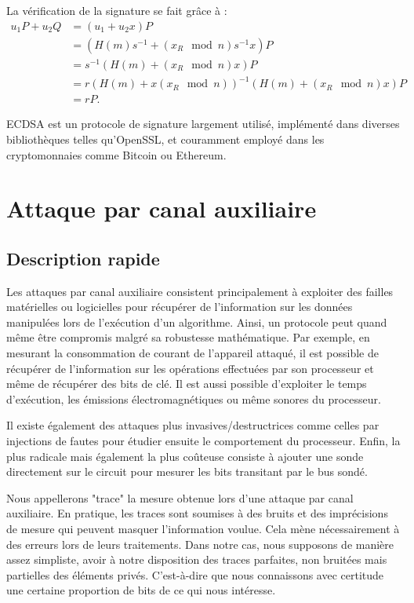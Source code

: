 \documentclass{backend}
\begin{document}
La vérification de la signature se fait grâce à :
\[
\begin{aligned}
    u_1 P + u_2 Q &= (u_1 + u_2 x) P \\
                  &= (H(m) s^{-1} + (x_R \mod n) s^{-1} x) P \\
                  &= s^{-1} (H(m) + (x_R \mod n) x) P \\
                  &= r (H(m) + x(x_R \mod n))^{-1} (H(m) + (x_R \mod n) x) P \\
                  &= rP.
\end{aligned}
\]

ECDSA est un protocole de signature largement utilisé, implémenté dans diverses bibliothèques telles qu'OpenSSL, et couramment employé dans les cryptomonnaies comme Bitcoin ou Ethereum.


\section{Attaque par canal auxiliaire} \label{sec:attaque_canal}

\subsection{Description rapide}

Les attaques par canal auxiliaire consistent principalement à exploiter des failles matérielles ou logicielles pour récupérer de l'information sur les données manipulées lors de l’exécution d'un algorithme. Ainsi, un protocole peut quand même être compromis malgré sa robustesse mathématique. Par exemple, en mesurant la consommation de courant de l'appareil attaqué, il est possible de récupérer de l'information sur les opérations effectuées par son processeur et même de récupérer des bits de clé. Il est aussi possible d'exploiter le temps d’exécution, les émissions électromagnétiques ou même sonores du processeur.\medbreak

Il existe également des attaques plus invasives/destructrices comme celles par injections de fautes pour étudier ensuite le comportement du processeur. Enfin, la plus radicale mais également la plus coûteuse consiste à ajouter une sonde directement sur le circuit pour mesurer les bits transitant par le bus sondé.\medbreak

Nous appellerons "trace" la mesure obtenue lors d'une attaque par canal auxiliaire. En pratique, les traces sont soumises à des bruits et des imprécisions de mesure qui peuvent masquer l'information voulue. Cela mène nécessairement à des erreurs lors de leurs traitements. Dans notre cas, nous supposons de manière assez simpliste, avoir à notre disposition des traces parfaites, non bruitées mais partielles des éléments privés. C'est-à-dire que nous connaissons avec certitude une certaine proportion de bits de ce qui nous intéresse.
\end{document}
